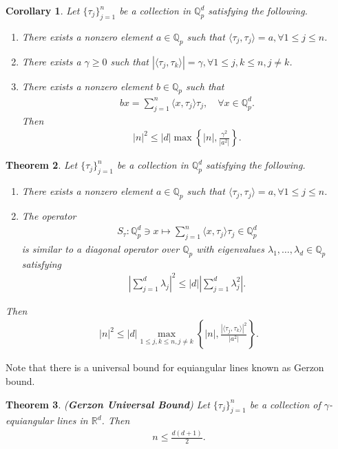 \documentclass{amsart}
\newtheorem{theorem}{Theorem}[section]
\newtheorem{corollary}[theorem] {Corollary}
\begin{document}
\begin{corollary}
	Let $\{\tau_j\}_{j=1}^n$ be a collection  in $\mathbb{Q}^d_p$ satisfying the following.	
	\begin{enumerate}[\upshape(i)]
		\item There exists a nonzero element  $a \in \mathbb{Q}_p$ such that  $\langle \tau_j, \tau_j\rangle =a,  \forall 1\leq j \leq n$.
		\item There exists a $\gamma\geq 0$ such that $|\langle \tau_j, \tau_k\rangle| =\gamma, \forall 1\leq j, k \leq n, j \neq k$.
		\item There exists a nonzero element  $b \in \mathbb{Q}_p$ such that 
		\begin{align*}
			bx=\sum_{j=1}^{n}\langle x, \tau_j\rangle \tau_j, \quad \forall x \in \mathbb{Q}^d_p.
		\end{align*} 
		Then 	
	\begin{align*}
		|n|^2\leq |d|\max\left\{|n|, \frac{\gamma^2}{|a^2|} \right\}.
	\end{align*}
	\end{enumerate}
\end{corollary}
\begin{theorem}
Let $\{\tau_j\}_{j=1}^n$ be a collection  in $\mathbb{Q}^d_p$ satisfying the following. 
\begin{enumerate}[\upshape(i)]
	\item There exists a nonzero element  $a \in \mathbb{Q}_p$ such that  $\langle \tau_j, \tau_j\rangle =a,  \forall 1\leq j \leq n$.
	\item The operator 
	\begin{align*}
		S_\tau : \mathbb{Q}_p^d\ni x \mapsto \sum_{j=1}^n\langle x, \tau_j\rangle \tau_j \in \mathbb{Q}_p^d
	\end{align*}
	is similar  to a diagonal operator over $\mathbb{Q}_p$  with eigenvalues $\lambda_1, \dots, \lambda_d \in \mathbb{Q}_p$ satisfying 
	\begin{align*}
		\left|\sum_{j=1}^{d}\lambda_j\right|^2\leq |d| \left|\sum_{j=1}^{d}\lambda_j^2\right|.	
	\end{align*}
\end{enumerate}
Then 
\begin{align*}
	|n|^2\leq |d|\max_{1\leq j,k \leq n, j \neq k}\left\{|n|, \frac{|\langle \tau_j,\tau_k\rangle |^2}{|a^2|}\right\}.
\end{align*}	
\end{theorem}
Note that there is a universal bound for equiangular lines known as Gerzon bound. 
\begin{theorem} \cite{WALDRONBOOK} \label{GBT}
(\textbf{Gerzon Universal Bound})
Let $\{\tau_j\}_{j=1}^n$  	be  a collection of $\gamma$-equiangular  lines in $\mathbb{R}^d$. 
	Then 
	\begin{align*}
	n \leq \frac{d(d+1)}{2}.
\end{align*}	
\end{theorem}
\end{document}
